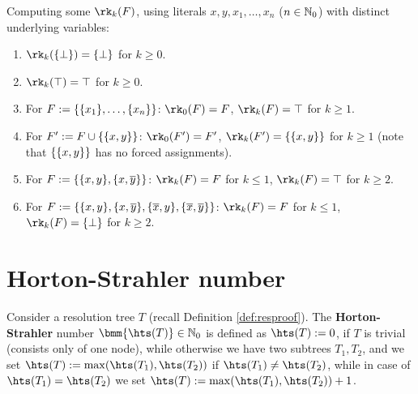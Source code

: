 \documentclass[]{book}
\begin{document}
\begin{examp}\label{exp:rk}
  Computing some $\rk_k(F)$, using literals $x,y,x_1,\dots,x_n$ ($n \in \mathbb{N}_0$) with distinct underlying variables:
  \begin{enumerate}
  \item $\rk_k(\set{\bot}) = \set{\bot}$ for $k \ge 0$.
  \item $\rk_k(\top) = \top$ for $k \ge 0$.
  \item For $F := \{ \{ x_1 \},\dots,\{ x_n \} \}$: $\rk_0(F) = F$, $\rk_k(F) = \top$ for $k \ge 1$.
  \item For $F' := F \cup \{ \{ x,y \} \}$: $\rk_0(F') = F'$, $\rk_k(F') = \set{\set{x,y}}$ for $k \ge 1$ (note that $\{ \{ x,y \} \}$ has no forced assignments).
  \item For $F := \{ \{ x,y \},\{ x,\overline{y} \} \}$: $\rk_k(F) = F$ for $k \le 1$, $\rk_k(F) = \top$ for $k \ge 2$.
  \item For $F := \{ \{ x,y \},\{ x,\overline{y} \}, \{ \overline{x},y \},\{ \overline{x},\overline{y} \} \}$: $\rk_k(F) = F$ for $k \le 1$, $\rk_k(F) = \set{\bot}$ for $k \ge 2$.
  \end{enumerate}
\end{examp}

\section{Horton-Strahler number}
\label{sec:hs}
\begin{defi}\label{def:hdtree}
  Consider a resolution tree $T$ (recall Definition \ref{def:resproof}). The \textbf{Horton-Strahler} number $\bmm{\hts(T)} \in \NNZ$ 
  is defined as $\hts(T) := 0$, if $T$ is trivial (consists only of one node), while otherwise we have two subtrees $T_1, T_2$, and 
  we set $\hts(T) := \max(\hts(T_1),\hts(T_2))$ if $\hts(T_1) \not= \hts(T_2)$, while in case of $\hts(T_1) = \hts(T_2)$ we set $\hts(T) := \max(\hts(T_1),\hts(T_2)) + 1$.
\end{defi}
\end{document}
